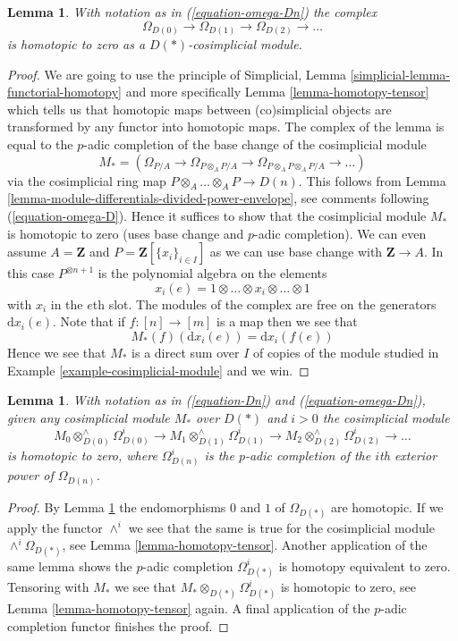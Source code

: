 \documentclass{stacks-project}
\theoremstyle{plain}
\newtheorem{lemma}[subsection]{Lemma}
\theoremstyle{definition}
\theoremstyle{remark}
\numberwithin{equation}{subsection}
\begin{document}
\begin{lemma}
\label{lemma-vanishing-omega-1}
With notation as in (\ref{equation-omega-Dn}) the complex
$$
\Omega_{D(0)} \to \Omega_{D(1)} \to \Omega_{D(2)} \to \ldots
$$
is homotopic to zero as a $D(*)$-cosimplicial module.
\end{lemma}

\begin{proof}
We are going to use the principle of
Simplicial, Lemma \ref{simplicial-lemma-functorial-homotopy}
and more specifically
Lemma \ref{lemma-homotopy-tensor}
which tells us that homotopic maps between (co)simplicial objects
are transformed by any functor into homotopic maps.
The complex of the lemma is equal to the $p$-adic completion of the
base change of the cosimplicial module
$$
M_* = \left(
\Omega_{P/A} \to
\Omega_{P \otimes_A P/A} \to
\Omega_{P \otimes_A P \otimes_A P/A} \to \ldots
\right)
$$
via the cosimplicial ring map $P\otimes_A \ldots \otimes_A P \to D(n)$. This
follows from Lemma \ref{lemma-module-differentials-divided-power-envelope},
see comments following (\ref{equation-omega-D}). Hence it
suffices to show that the cosimplicial module $M_*$ is homotopic to zero
(uses base change and $p$-adic completion).
We can even assume $A = \mathbf{Z}$ and $P = \mathbf{Z}[\{x_i\}_{i \in I}]$
as we can use base change with $\mathbf{Z} \to A$.
In this case $P^{\otimes n + 1}$ is the polynomial algebra on the elements
$$
x_i(e) = 1 \otimes \ldots \otimes x_i \otimes \ldots \otimes 1
$$
with $x_i$ in the $e$th slot. The modules of the complex are free on the
generators $\text{d}x_i(e)$. Note that if $f : [n] \to [m]$ is a
map then we see that
$$
M_*(f)(\text{d}x_i(e)) = \text{d}x_i(f(e))
$$
Hence we see that $M_*$ is a direct sum over $I$ of copies of the module
studied in Example \ref{example-cosimplicial-module} and we win.
\end{proof}

\begin{lemma}
\label{lemma-vanishing}
With notation as in (\ref{equation-Dn}) and (\ref{equation-omega-Dn}),
given any cosimplicial module $M_*$ over $D(*)$ and
$i > 0$ the cosimplicial module
$$
M_0 \otimes^\wedge_{D(0)} \Omega^i_{D(0)} \to
M_1 \otimes^\wedge_{D(1)} \Omega^i_{D(1)} \to
M_2 \otimes^\wedge_{D(2)} \Omega^i_{D(2)} \to \ldots
$$
is homotopic to zero, where $\Omega^i_{D(n)}$ is the $p$-adic completion
of the $i$th exterior power of $\Omega_{D(n)}$.
\end{lemma}

\begin{proof}
By Lemma \ref{lemma-vanishing-omega-1} the endomorphisms $0$ and $1$
of $\Omega_{D(*)}$ are homotopic.
If we apply the functor $\wedge^i$ we see that
the same is true for the cosimplicial module $\wedge^i\Omega_{D(*)}$, see
Lemma \ref{lemma-homotopy-tensor}.
Another application of the same lemma shows the $p$-adic completion
$\Omega^i_{D(*)}$ is homotopy equivalent to zero.
Tensoring with $M_*$ we see that $M_* \otimes_{D(*)} \Omega^i_{D(*)}$
is homotopic to zero, see Lemma \ref{lemma-homotopy-tensor} again.
A final application of the $p$-adic completion functor finishes the proof.
\end{proof}
\end{document}
